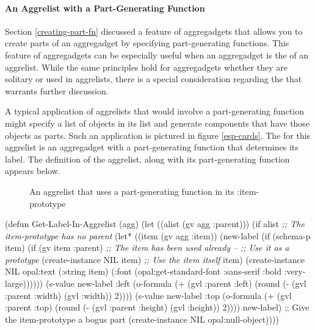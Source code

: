 \paragraph{An Aggrelist with a Part-Generating Function}
\label{multi-parts-fn}

Section \ref{creating-part-fn} discussed a feature of aggregadgets
that allows you to create parts of an aggregadget by specifying
part-generating functions.  This feature of aggregadgets can be
especially useful when an aggregadget is the  of
an aggrelist.  While the same principles hold for aggregadgets whether
they are solitary or used in aggrelists, there is a special
consideration regarding the  that warrants
further discussion.

A typical application of aggrelists that would involve a
part-generating function might specify a list of objects in its
 list and generate components that have those objects as
parts.  Such an application is pictured in figure \ref{esp-cards}.
The  for this aggrelist is an aggregadget with a
part-generating function that determines its label.  The definition of
the aggrelist, along with its part-generating function appears below.

\begin{figure}
\begin{center}
\end{center}
\caption{An aggrelist that uses a part-generating function in its
:item-prototype}
\end{figure}

\begin{programexample}
(defun Get-Label-In-Aggrelist (agg)
  (let ((alist (gv agg :parent)))
    (if alist  {\it ;; The item-prototype has no parent}
	(let* ((item (gv agg :item))
	       (new-label (if (schema-p item)
			      (if (gv item :parent)
				  {\it ;; The item has been used already --}
				  {\it ;; Use it as a prototype}
				  (create-instance NIL item)
				  {\it ;; Use the item itself}
				  item)
			      (create-instance NIL opal:text
				(:string item)
				(:font (opal:get-standard-font
					:sans-serif :bold :very-large))))))
	  (s-value new-label :left
		   (o-formula (+ (gvl :parent :left)
				 (round (- (gvl :parent :width)
					   (gvl :width)) 2))))
	  (s-value new-label :top
		   (o-formula (+ (gvl :parent :top)
				 (round (- (gvl :parent :height)
					   (gvl :height)) 2))))
	  new-label)
        ;; Give the item-prototype a bogus part
        (create-instance NIL opal:null-object))))
\end{programexample}

